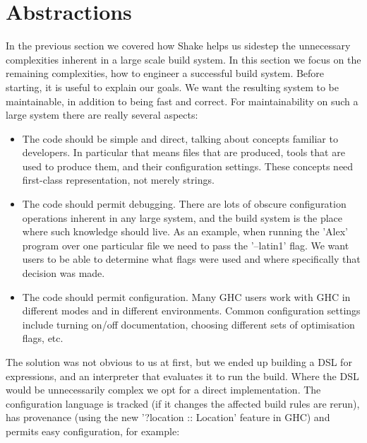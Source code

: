 \section{Abstractions\label{sec:abstractions}}


In the previous section we covered how Shake helps us sidestep the unnecessary
complexities inherent in a large scale build system. In this section we focus on
the remaining complexities, how to engineer a successful build system. Before
starting, it is useful to explain our goals. We want the resulting system to be
maintainable, in addition to being fast and correct. For maintainability on such
a large system there are really several aspects:

\begin{itemize}
\item The code should be simple and direct, talking about concepts familiar to
developers. In particular that means files that are produced, tools that are
used to produce them, and their configuration settings. These concepts
need first-class representation, not merely strings.
\item The code should permit debugging. There are lots of obscure configuration
operations inherent in any large system, and the build system is the place where
such knowledge should live. As an example, when running the \lst'Alex'
program over one particular file we need to pass the \lst'--latin1' flag. We
want users to be able to determine what flags were used and where specifically
that decision was made.
\item The code should permit configuration. Many GHC users work with GHC in
different modes and in different environments. Common configuration settings
include turning on/off documentation, choosing different sets of optimisation flags,
etc.
\end{itemize}

The solution was not obvious to us at first, but we ended up building a DSL for
expressions, and an interpreter that evaluates it to run the build. Where the
DSL would be unnecessarily complex we opt for a direct implementation. The
configuration language is tracked (if it changes the affected build rules are
rerun), has provenance (using the new \lst'?location :: Location' feature in
GHC) and permits easy configuration, for example:

